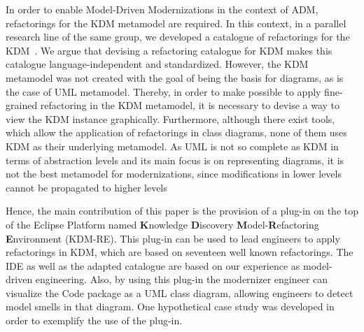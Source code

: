 In order to enable Model-Driven Modernizations in the context of ADM, refactorings for the KDM metamodel are required. In this context, in a parallel research line of the same group, we developed a catalogue of refactorings for the KDM~\cite{iri_catalogue_of_refactoring_2014}. We argue that devising a refactoring catalogue for KDM makes this catalogue language-independent and standardized. However, the KDM metamodel was not created with the goal of being the basis for diagrams, as is the case of UML metamodel. Thereby, in order to make possible to apply fine-grained refactoring in the KDM metamodel, it is necessary to devise a way to view the KDM instance graphically. Furthermore, although there exist tools, which allow the application of refactorings in class diagrams, none of them uses KDM as their underlying metamodel. As UML is not so complete as KDM in terms of abstraction levels and its main focus is on representing diagrams, it is not the best metamodel for modernizations, since modifications in lower levels cannot be propagated to higher levels
%
%

Hence, the main contribution of this paper is the provision of a plug-in on the top of the Eclipse Platform named  \textbf{K}nowledge \textbf{D}iscovery \textbf{M}odel-\textbf{R}efactoring \textbf{E}nvironment (KDM-RE). This plug-in can be used to lead engineers to apply refactorings in KDM, which are based on seventeen well known refactorings\cite{refactImpro}. The IDE as well as the adapted catalogue are based on our experience as model-driven engineering. Also, by using this plug-in the modernizer engineer can visualize the Code package as a UML class diagram, allowing engineers to detect model smells in that diagram. One hypothetical case study was developed in order to exemplify the use of the plug-in.

